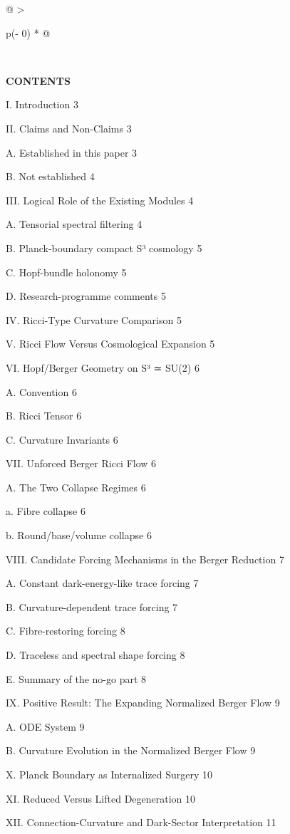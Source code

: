 \documentclass[
]{article}
\begin{document}
\begin{longtable}[]{@{}
  >{\raggedright\arraybackslash}p{(\columnwidth - 0\tabcolsep) * }@{}}
\begin{minipage}[t]{\linewidth}
\end{minipage} \\
\end{longtable}

\textbf{CONTENTS}

I. Introduction 3

II. Claims and Non-Claims 3

A. Established in this paper 3

B. Not established 4

III. Logical Role of the Existing Modules 4

A. Tensorial spectral filtering 4

B. Planck-boundary compact S³ cosmology 5

C. Hopf-bundle holonomy 5

D. Research-programme comments 5

IV. Ricci-Type Curvature Comparison 5

V. Ricci Flow Versus Cosmological Expansion 5

VI. Hopf/Berger Geometry on S³ ≃ SU(2) 6

A. Convention 6

B. Ricci Tensor 6

C. Curvature Invariants 6

VII. Unforced Berger Ricci Flow 6

A. The Two Collapse Regimes 6

a. Fibre collapse 6

b. Round/base/volume collapse 6

VIII. Candidate Forcing Mechanisms in the Berger Reduction 7

A. Constant dark-energy-like trace forcing 7

B. Curvature-dependent trace forcing 7

C. Fibre-restoring forcing 8

D. Traceless and spectral shape forcing 8

E. Summary of the no-go part 8

IX. Positive Result: The Expanding Normalized Berger Flow 9

A. ODE System 9

B. Curvature Evolution in the Normalized Berger Flow 9

X. Planck Boundary as Internalized Surgery 10

XI. Reduced Versus Lifted Degeneration 10

XII. Connection-Curvature and Dark-Sector Interpretation 11
\end{document}
